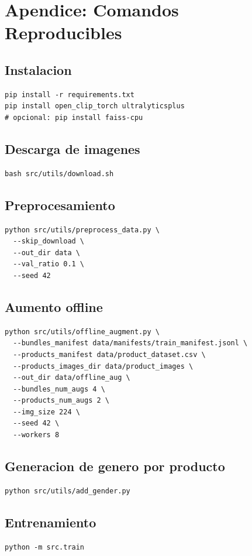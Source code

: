 \section*{Apendice: Comandos Reproducibles}

\subsection{Instalacion}
\begin{verbatim}
pip install -r requirements.txt
pip install open_clip_torch ultralyticsplus
# opcional: pip install faiss-cpu
\end{verbatim}

\subsection{Descarga de imagenes}
\begin{verbatim}
bash src/utils/download.sh
\end{verbatim}

\subsection{Preprocesamiento}
\begin{verbatim}
python src/utils/preprocess_data.py \
  --skip_download \
  --out_dir data \
  --val_ratio 0.1 \
  --seed 42
\end{verbatim}

\subsection{Aumento offline}
\begin{verbatim}
python src/utils/offline_augment.py \
  --bundles_manifest data/manifests/train_manifest.jsonl \
  --products_manifest data/product_dataset.csv \
  --products_images_dir data/product_images \
  --out_dir data/offline_aug \
  --bundles_num_augs 4 \
  --products_num_augs 2 \
  --img_size 224 \
  --seed 42 \
  --workers 8
\end{verbatim}

\subsection{Generacion de genero por producto}
\begin{verbatim}
python src/utils/add_gender.py
\end{verbatim}

\subsection{Entrenamiento}
\begin{verbatim}
python -m src.train
\end{verbatim}

